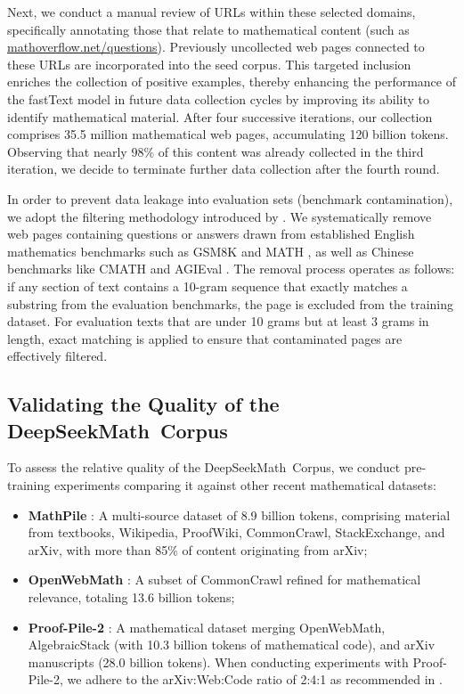 Next, we conduct a manual review of URLs within these selected domains, specifically annotating those that relate to mathematical content (such as \url{mathoverflow.net/questions}). Previously uncollected web pages connected to these URLs are incorporated into the seed corpus. This targeted inclusion enriches the collection of positive examples, thereby enhancing the performance of the fastText model in future data collection cycles by improving its ability to identify mathematical material. After four successive iterations, our collection comprises 35.5 million mathematical web pages, accumulating 120 billion tokens. Observing that nearly 98\% of this content was already collected in the third iteration, we decide to terminate further data collection after the fourth round.

In order to prevent data leakage into evaluation sets (benchmark contamination), we adopt the filtering methodology introduced by \cite{deepseek-coder}. We systematically remove web pages containing questions or answers drawn from established English mathematics benchmarks such as GSM8K \citep{gsm8k} and MATH \citep{MATH}, as well as Chinese benchmarks like CMATH \citep{wei2023cmath} and AGIEval \citep{agieval}. The removal process operates as follows: if any section of text contains a 10-gram sequence that exactly matches a substring from the evaluation benchmarks, the page is excluded from the training dataset. For evaluation texts that are under 10 grams but at least 3 grams in length, exact matching is applied to ensure that contaminated pages are effectively filtered.

\subsection{Validating the Quality of the DeepSeekMath~Corpus}

To assess the relative quality of the DeepSeekMath~Corpus, we conduct pre-training experiments comparing it against other recent mathematical datasets:

\begin{itemize}[topsep=0pt]
    \item \textbf{MathPile} \citep{mathpile}: A multi-source dataset of 8.9 billion tokens, comprising material from textbooks, Wikipedia, ProofWiki, CommonCrawl, StackExchange, and arXiv, with more than 85\% of content originating from arXiv;
    \item \textbf{OpenWebMath} \citep{openwebmath}: A subset of CommonCrawl refined for mathematical relevance, totaling 13.6 billion tokens;
    \item \textbf{Proof-Pile-2} \citep{llemma}: A mathematical dataset merging OpenWebMath, AlgebraicStack (with 10.3 billion tokens of mathematical code), and arXiv manuscripts (28.0 billion tokens). When conducting experiments with Proof-Pile-2, we adhere to the arXiv:Web:Code ratio of 2:4:1 as recommended in \cite{llemma}.
\end{itemize}


